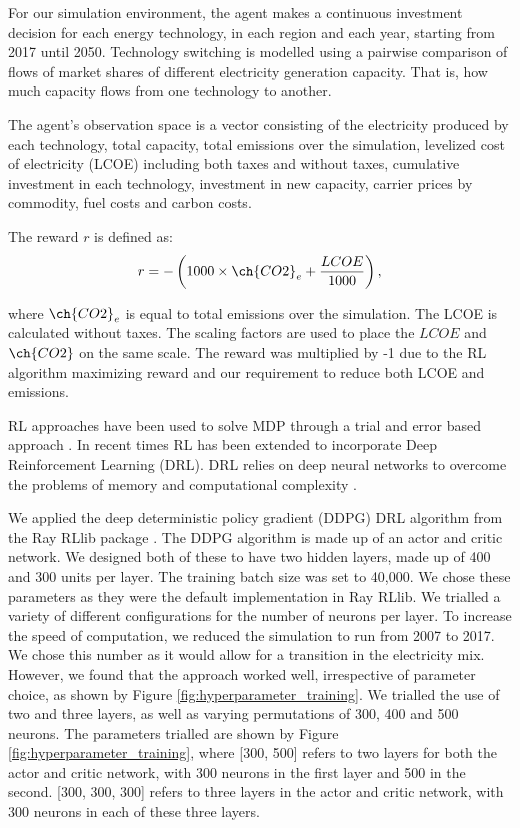 \documentclass{article}
\begin{document}
For our simulation environment, the agent makes a continuous investment decision for each energy technology, in each region and each year, starting from 2017 until 2050. 	Technology switching is modelled using a pairwise comparison of flows of market shares of different electricity generation capacity. That is, how much capacity flows from one technology to another. 

The agent's observation space is a vector consisting of the electricity produced by each technology, total capacity, total  emissions over the simulation, levelized cost of electricity (LCOE) including both taxes and without taxes, cumulative investment in each technology, investment in new capacity, carrier prices by commodity, fuel costs and carbon costs.

The reward $r$ is defined as:
\begin{equation}
\label{eq:reward_function}
	r = -\left(1000\times\ch{CO2}_e + \frac{LCOE}{1000}\right),
\end{equation}

where $\ch{CO2}_e$ is equal to total  emissions over the simulation. The LCOE is calculated without taxes. The scaling factors are used to place the $LCOE$ and $\ch{CO2}$ on the same scale. The reward was multiplied by -1 due to the RL algorithm maximizing reward and our requirement to reduce both LCOE and  emissions.


RL approaches have been used to solve MDP through a trial and error based approach \cite{Sutton2015}. In recent times RL has been extended to incorporate Deep Reinforcement Learning (DRL). DRL relies on deep neural networks to overcome the problems of memory and computational complexity \cite{Arulkumaran2017}. 

We applied the deep deterministic policy gradient (DDPG) DRL algorithm \cite{Hunt2016a} from the Ray RLlib package \cite{Liang2014}. The DDPG algorithm is made up of an actor and critic network. We designed both of these to have two hidden layers, made up of 400 and 300 units per layer. The training batch size was set to 40,000. We chose these parameters as they were the default implementation in Ray RLlib. We trialled a variety of different configurations for the number of neurons per layer. To increase the speed of computation, we reduced the simulation to run from 2007 to 2017. We chose this number as it would allow for a transition in the electricity mix. However, we found that the approach worked well, irrespective of parameter choice, as shown by Figure \ref{fig:hyperparameter_training}. We trialled the use of two and three layers, as well as varying permutations of 300, 400 and 500 neurons. The parameters trialled are shown by Figure \ref{fig:hyperparameter_training}, where [300, 500] refers to two layers for both the actor and critic network, with 300 neurons in the first layer and 500 in the second. [300, 300, 300] refers to three layers in the actor and critic network, with 300 neurons in each of these three layers.
\end{document}
